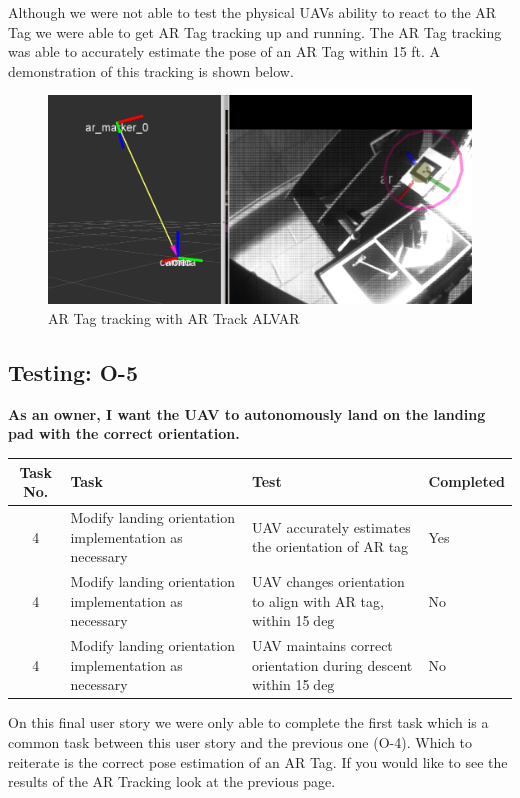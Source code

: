 \vfill
Although we were not able to test the physical UAVs ability to react to the AR Tag we were able to get AR Tag tracking up and running. The AR Tag tracking was able to accurately estimate the pose of an AR Tag within 15 ft. A demonstration of this tracking is shown below.
\begin{figure}[H]
\centering
\includegraphics[width=\textwidth]{images/poseEstimation.png}
\caption{AR Tag tracking with AR Track ALVAR}
\end{figure}

\newpage
\subsection{Testing: O-5}
\textbf{As an owner, I want the UAV to autonomously land on the landing pad with the correct orientation.}\\
\begin{tabular}{| c | >{\raggedright}m{4cm} | m{4cm} | m{4cm} |}\hline
	Task No. & Task & Test & Completed\\\hline
		4 & Modify landing orientation implementation as necessary & UAV accurately estimates the orientation of AR tag & Yes\\ \hline
		4 & Modify landing orientation implementation as necessary & UAV changes orientation to align with AR tag, within 15$\deg$ & No\\ \hline
		4 & Modify landing orientation implementation as necessary & UAV maintains correct orientation during descent within 15$\deg$ & No\\ \hline
\end{tabular}

\vspace{4cm}
On this final user story we were only able to complete the first task which is a common task between this user story and the previous one (O-4). Which to reiterate is the correct pose estimation of an AR Tag. If you would like to see the results of the AR Tracking look at the previous page.

